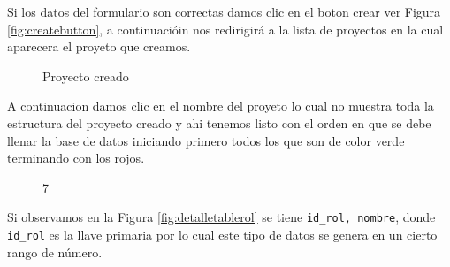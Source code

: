 Si los datos del formulario son correctas damos clic en el boton crear ver Figura \ref{fig:createbutton}, a continuaci\'oin nos redirigir\'a a la lista de proyectos en la cual aparecera el proyeto que creamos. 
\begin{figure}[H]
\caption{Proyecto creado} \label{fig:viewprojectcreated}
\centering
{}
\end{figure}
A continuacion damos clic en el nombre del proyeto lo cual no muestra toda la estructura del proyecto creado y ahi tenemos listo con el orden en que se debe llenar la base de datos iniciando primero todos los que son de color verde terminando con los rojos.
\begin{figure}[H]
\caption{7}
\centering
{}
\end{figure}
Si observamos en la Figura \ref{fig:detalletablerol} se tiene \texttt{id\_rol, nombre}, donde \texttt{id\_rol} es la llave primaria por lo cual este tipo de datos se genera en un cierto rango de n\'umero.

